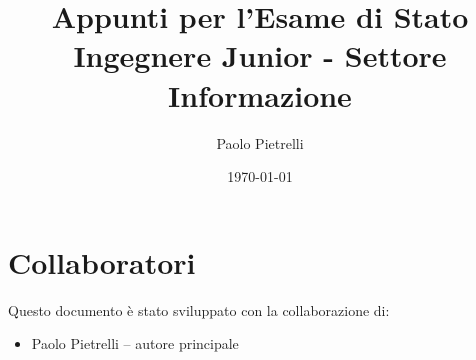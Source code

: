 \documentclass[a4paper,12pt,openright,twoside]{book} %
\title{Appunti per l'Esame di Stato\\Ingegnere Junior - Settore Informazione}
\author{Paolo Pietrelli}
\date{\today} %
\begin{document}
\sloppy %

\frontmatter %

\maketitle %


\tableofcontents %
\listoffigures %
\lstlistoflistings %

\mainmatter %

\maketitle

\cleardoublepage
\chapter*{Collaboratori}
Questo documento è stato sviluppato con la collaborazione di:

\begin{itemize}
  \item Paolo Pietrelli – autore principale
\end{itemize}

\cleardoublepage





\end{document}
